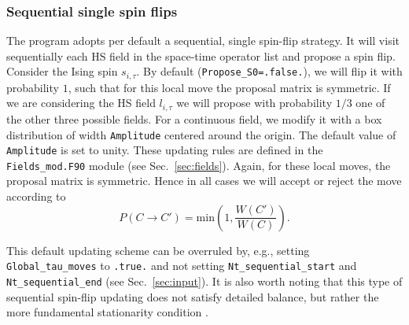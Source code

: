 \subsubsection{Sequential single spin flips}
%
\label{sec:sequential}
The program adopts per default a sequential, single spin-flip strategy. It will visit sequentially each HS field in the space-time operator list and  propose a spin flip. Consider  the Ising spin $s_{i,\tau}$. By default (\texttt{Propose\_S0=.false.}), we will flip it with probability $1$, such that for  this local move  the  proposal matrix is symmetric.  If we are considering the HS field $l_{i,\tau}$  we will propose with probability $1/3$ one  of the other three  possible fields.    For a continuous field, we  modify it with a box distribution of width \texttt{Amplitude}  centered around the origin.   The default value of  \texttt{Amplitude} is set to unity. These updating rules are defined in the   \texttt{Fields\_mod.F90} module  (see Sec.~\ref{sec:fields}). Again, for these local moves, the proposal matrix is symmetric.  Hence in all cases we will accept or reject the move according to 
\begin{equation}
P(C \rightarrow C') =  \text{min}  \left( 1, \frac{ W(C')}{W(C)} \right).
\end{equation}

This default updating scheme can be overruled by, e.g., setting \texttt{Global\_tau\_moves} to \texttt{.true.} and not setting \texttt{Nt\_sequential\_start} and \texttt{Nt\_sequential\_end} (see Sec.~\ref{sec:input}).
It is also worth noting that this type of sequential spin-flip updating does not satisfy detailed balance, but rather the more fundamental stationarity condition \cite{Sokal89}. 


%
